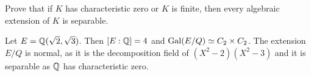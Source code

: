 \begin{exercise}
Prove that if $K$ has characteristic zero or $K$ is finite, then 
every algebraic extension of $K$ is separable. 
\end{exercise}


%



%
%
\begin{example}
    Let $E=\mathbb{Q}(\sqrt{2},\sqrt{3})$. Then 
    $[E:\mathbb{Q}]=4$ and 
    $\operatorname{Gal}(E/Q)\simeq C_2\times C_2$. The extension $E/Q$ is normal, 
    as it is the decomposition field of $(X^2-2)(X^2-3)$ and 
    it is separable as $\mathbb{Q}$ has characteristic zero. 
\end{example}


